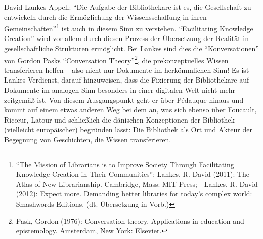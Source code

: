 David Lankes Appell: \enquote{Die Aufgabe der Bibliothekare ist es, die
Gesellschaft zu entwickeln durch die Ermöglichung der Wissensschaffung
in ihren Gemeinschaften}\footnote{\enquote{The Mission of Librarians is
  to Improve Society Through Facilitating Knowledge Creation in Their
  Communities}: Lankes, R. David (2011): The Atlas of New Librarianship.
  Cambridge, Mass: MIT Press; - Lankes, R. David (2012): Expect more.
  Demanding better libraries for today's complex world: Smashwords
  Editions. (dt. Übersetzung in Vorb.)} ist auch in diesem Sinn zu
verstehen. \enquote{Facilitating Knowledge Creation} wird vor allem
durch diesen Prozess der Übersetzung der Realität in gesellschaftliche
Strukturen ermöglicht. Bei Lankes sind dies die \enquote{Konversationen}
von Gordon Pasks \enquote{Conversation Theory}\footnote{Pask, Gordon
  (1976): Conversation theory. Applications in education and
  epistemology. Amsterdam, New York: Elsevier.}, die prekonzeptuelles
Wissen transferieren helfen -- also nicht nur Dokumente im herkömmlichen
Sinn! Es ist Lankes Verdienst, darauf hinzuweisen, dass die Fixierung
der Bibliothekare auf Dokumente im analogen Sinn besonders in einer
digitalen Welt nicht mehr zeitgemäß ist. Von diesem Ausgangspunkt geht
er über Pédauque hinaus und kommt auf einem etwas anderen Weg bei dem
an, was sich ebenso über Foucault, Ricœur, Latour und schließlich die
dänischen Konzeptionen der Bibliothek (vielleicht europäischer)
begründen lässt: Die Bibliothek als Ort und Akteur der Begegnung von
Geschichten, die Wissen transferieren. 
